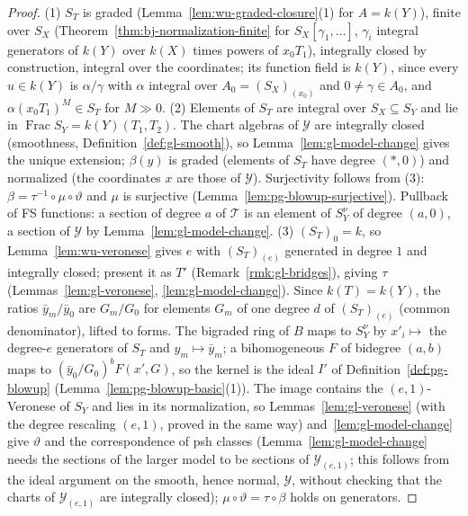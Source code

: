 \begin{proof}
(1) $S_T$ is graded (Lemma~\ref{lem:wu-graded-closure}(1) for $A=k(Y)$), finite over $S_X$ (Theorem~\ref{thm:bj-normalization-finite} for $S_X[\gamma_1,\dots]$,
$\gamma_i$ integral generators of $k(Y)$ over $k(X)$ times powers of $x_0T_1$), integrally closed by construction, integral over the coordinates; its function field
is $k(Y)$, since every $u\in k(Y)$ is $\alpha/\gamma$ with $\alpha$ integral over $A_0=(S_X)_{(x_0)}$ and $0\ne\gamma\in A_0$, and $\alpha(x_0T_1)^M\in S_T$ for $M\gg0$.
(2) Elements of $S_T$ are integral over $S_X\subseteq S_Y$ and lie in $\operatorname{Frac}S_Y=k(Y)(T_1,T_2)$. The chart algebras of $\mathcal Y$ are integrally
closed (smoothness, Definition~\ref{def:gl-smooth}), so Lemma~\ref{lem:gl-model-change} gives the unique extension; $\beta(y)$ is graded (elements of $S_T$ have
degree $(\ast,0)$) and normalized (the coordinates $x$ are those of $\mathcal Y$). Surjectivity follows from (3): $\beta=\tau^{-1}\circ\mu\circ\vartheta$ and $\mu$ is
surjective (Lemma~\ref{lem:pg-blowup-surjective}). Pullback of FS functions: a section of degree $a$ of $\mathcal T$ is an element of $S_Y^\nu$ of degree $(a,0)$, a section of $\mathcal Y$ by Lemma~\ref{lem:gl-model-change}. (3)
$(S_T)_0=k$, so Lemma~\ref{lem:wu-veronese} gives $e$ with $(S_T)_{(e)}$ generated in degree $1$ and integrally closed; present it as $T'$ (Remark~\ref{rmk:gl-bridges}),
giving $\tau$ (Lemmas~\ref{lem:gl-veronese}, \ref{lem:gl-model-change}). Since $k(T)=k(Y)$, the ratios $\bar y_m/\bar y_0$ are $G_m/G_0$ for elements $G_m$ of one degree
$d$ of $(S_T)_{(e)}$ (common denominator), lifted to forms. The bigraded ring of $B$ maps to $S_Y^\nu$ by $x'_i\mapsto$ the degree-$e$ generators of $S_T$ and
$y_m\mapsto\bar y_m$; a bihomogeneous $F$ of bidegree $(a,b)$ maps to $(\bar y_0/G_0)^bF(x',G)$, so the kernel is the ideal $I'$ of Definition~\ref{def:pg-blowup}
(Lemma~\ref{lem:pg-blowup-basic}(1)). The image contains the $(e,1)$-Veronese of $S_Y$ and lies in its normalization, so Lemmas~\ref{lem:gl-veronese} (with the degree
rescaling $(e,1)$, proved in the same way) and~\ref{lem:gl-model-change} give $\vartheta$ and the correspondence of psh classes (Lemma~\ref{lem:gl-model-change} needs the sections
of the larger model to be sections of $\mathcal Y_{(e,1)}$; this follows from the ideal argument on the smooth, hence normal, $\mathcal Y$, without checking that the charts of
$\mathcal Y_{(e,1)}$ are integrally closed); $\mu\circ\vartheta=\tau\circ\beta$ holds on
generators.
\end{proof}

